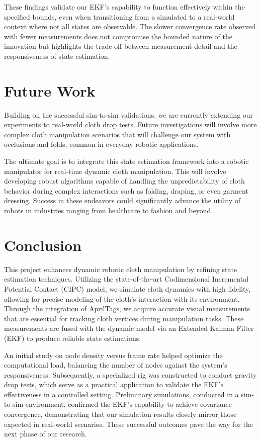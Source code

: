 \documentclass[subscriptcorrection,upint,varvw,barcolor=Goldenrod3,mathalfa=cal=euler,balance,hyphenate,french,pdf-a, nofoot]{asmejour} %
\begin{document}
These findings validate our EKF's capability to function effectively within the specified bounds, even when transitioning from a simulated to a real-world context where not all states are observable. The slower convergence rate observed with fewer measurements does not compromise the bounded nature of the innovation but highlights the trade-off between measurement detail and the responsiveness of state estimation.

\section{Future Work}
Building on the successful sim-to-sim validations, we are currently extending our experiments to real-world cloth drop tests. Future investigations will involve more complex cloth manipulation scenarios that will challenge our system with occlusions and folds, common in everyday robotic applications.

The ultimate goal is to integrate this state estimation framework into a robotic manipulator for real-time dynamic cloth manipulation. This will involve developing robust algorithms capable of handling the unpredictability of cloth behavior during complex interactions such as folding, draping, or even garment dressing. Success in these endeavors could significantly advance the utility of robots in industries ranging from healthcare to fashion and beyond.

\section{Conclusion}

This project enhances dynamic robotic cloth manipulation by refining state estimation techniques. Utilizing the state-of-the-art Codimensional Incremental Potential Contact (CIPC) model, we simulate cloth dynamics with high fidelity, allowing for precise modeling of the cloth's interaction with its environment. Through the integration of AprilTags, we acquire accurate visual measurements that are essential for tracking cloth vertices during manipulation tasks. These measurements are fused with the dynamic model via an Extended Kalman Filter (EKF) to produce reliable state estimations.

An initial study on node density versus frame rate helped optimize the computational load, balancing the number of nodes against the system's responsiveness. Subsequently, a specialized rig was constructed to conduct gravity drop tests, which serve as a practical application to validate the EKF's effectiveness in a controlled setting. Preliminary simulations, conducted in a sim-to-sim environment, confirmed the EKF's capability to achieve covariance convergence, demonstrating that our simulation results closely mirror those expected in real-world scenarios. These successful outcomes pave the way for the next phase of our research.
\end{document}
